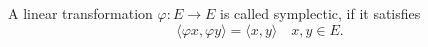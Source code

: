 A linear transformation $\varphi: E \rightarrow E$ is called symplectic, if it satisfies
$$\langle \varphi x, \varphi y \rangle = \langle x, y \rangle \quad x, y \in E.$$
